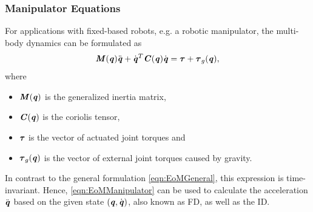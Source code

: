 \subsubsection{Manipulator Equations}
For applications with fixed-based robots, e.g. a robotic manipulator, the multi-body dynamics can be formulated as
\begin{equation} \label{eqn:EoMManipulator}
\bm{\mathit{M}}(\bm{\mathit{q}})\ddot{\bm{\mathit{q}}}+\dot{\bm{\mathit{q}}}^T\bm{\mathit{C}}(\bm{\mathit{q}})\dot{\bm{\mathit{q}}}=\bm{\mathit{\tau}}+\bm{\mathit{\tau}}_g(\bm{\mathit{q}}),
\end{equation}
where 
\begin{itemize}
\item $\bm{\mathit{M}}(\bm{\mathit{q}})$ is the generalized inertia matrix, 
\item $\bm{\mathit{C}}(\bm{\mathit{q}})$ is the coriolis tensor, 
\item $\bm{\mathit{\tau}}$ is the vector of actuated joint torques and 
\item $\bm{\mathit{\tau}}_g(\bm{\mathit{q}})$ is the vector of external joint torques caused by gravity.
\end{itemize}
In contrast to the general formulation \cref{eqn:EoMGeneral}, this expression is time-invariant. Hence, \cref{eqn:EoMManipulator} can be used to calculate the acceleration $\ddot{\bm{\mathit{q}}}$ based on the given state $(\bm{\mathit{q}}, \dot{\bm{\mathit{q}}})$, also known as \gls{FD}, as well as the \gls{ID}.
